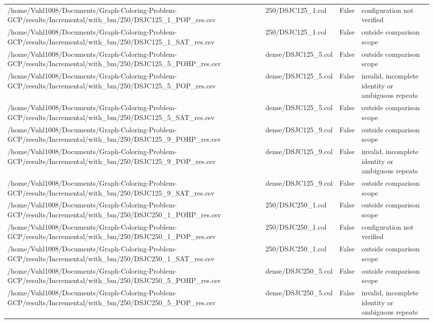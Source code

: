 \begin{table}[htbp]
\begin{tabular}{llll}
/home/Vuhl1008/Documents/Graph-Coloring-Problem-GCP/results/Incremental/with\_bm/250/DSJC125\_1\_POP\_res.csv & 250/DSJC125\_1.col & False & configuration not verified \\
/home/Vuhl1008/Documents/Graph-Coloring-Problem-GCP/results/Incremental/with\_bm/250/DSJC125\_1\_SAT\_res.csv & 250/DSJC125\_1.col & False & outside comparison scope \\
/home/Vuhl1008/Documents/Graph-Coloring-Problem-GCP/results/Incremental/with\_bm/250/DSJC125\_5\_POHP\_res.csv & dense/DSJC125\_5.col & False & outside comparison scope \\
/home/Vuhl1008/Documents/Graph-Coloring-Problem-GCP/results/Incremental/with\_bm/250/DSJC125\_5\_POP\_res.csv & dense/DSJC125\_5.col & False & invalid, incomplete identity or ambiguous repeats \\
/home/Vuhl1008/Documents/Graph-Coloring-Problem-GCP/results/Incremental/with\_bm/250/DSJC125\_5\_SAT\_res.csv & dense/DSJC125\_5.col & False & outside comparison scope \\
/home/Vuhl1008/Documents/Graph-Coloring-Problem-GCP/results/Incremental/with\_bm/250/DSJC125\_9\_POHP\_res.csv & dense/DSJC125\_9.col & False & outside comparison scope \\
/home/Vuhl1008/Documents/Graph-Coloring-Problem-GCP/results/Incremental/with\_bm/250/DSJC125\_9\_POP\_res.csv & dense/DSJC125\_9.col & False & invalid, incomplete identity or ambiguous repeats \\
/home/Vuhl1008/Documents/Graph-Coloring-Problem-GCP/results/Incremental/with\_bm/250/DSJC125\_9\_SAT\_res.csv & dense/DSJC125\_9.col & False & outside comparison scope \\
/home/Vuhl1008/Documents/Graph-Coloring-Problem-GCP/results/Incremental/with\_bm/250/DSJC250\_1\_POHP\_res.csv & 250/DSJC250\_1.col & False & outside comparison scope \\
/home/Vuhl1008/Documents/Graph-Coloring-Problem-GCP/results/Incremental/with\_bm/250/DSJC250\_1\_POP\_res.csv & 250/DSJC250\_1.col & False & configuration not verified \\
/home/Vuhl1008/Documents/Graph-Coloring-Problem-GCP/results/Incremental/with\_bm/250/DSJC250\_1\_SAT\_res.csv & 250/DSJC250\_1.col & False & outside comparison scope \\
/home/Vuhl1008/Documents/Graph-Coloring-Problem-GCP/results/Incremental/with\_bm/250/DSJC250\_5\_POHP\_res.csv & dense/DSJC250\_5.col & False & outside comparison scope \\
/home/Vuhl1008/Documents/Graph-Coloring-Problem-GCP/results/Incremental/with\_bm/250/DSJC250\_5\_POP\_res.csv & dense/DSJC250\_5.col & False & invalid, incomplete identity or ambiguous repeats \\

\end{tabular}
\end{table}
